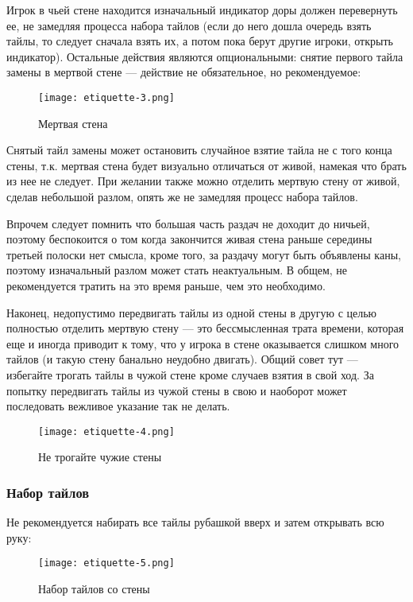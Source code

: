 Игрок в чьей стене находится изначальный индикатор доры должен перевернуть ее, не замедляя процесса набора тайлов (если до него дошла очередь взять тайлы, то следует сначала взять их, а потом пока берут другие игроки, открыть индикатор). Остальные действия являются опциональными: снятие первого тайла замены в мертвой стене --- действие не обязательное, но рекомендуемое:

\begin{figure}[H]
	\centering
	\texttt{[image: etiquette-3.png]}
	\caption{Мертвая стена}
\end{figure}

Снятый тайл замены может остановить случайное взятие тайла не с того конца стены, т.к. мертвая стена будет визуально отличаться от живой, намекая что брать из нее не следует. При желании также можно отделить мертвую стену от живой, сделав небольшой разлом, опять же не замедляя процесс набора тайлов.

Впрочем следует помнить что большая часть раздач не доходит до ничьей, поэтому беспокоится о том когда закончится живая стена раньше середины третьей полоски нет смысла, кроме того, за раздачу могут быть объявлены каны, поэтому изначальный разлом может стать неактуальным. В общем, не рекомендуется тратить на это время раньше, чем это необходимо.

Наконец, недопустимо передвигать тайлы из одной стены в другую с целью полностью отделить мертвую стену --- это бессмысленная трата времени, которая еще и иногда приводит к тому, что у игрока в стене оказывается слишком много тайлов (и такую стену банально неудобно двигать). Общий совет тут --- избегайте трогать тайлы в чужой стене кроме случаев взятия в свой ход. За попытку передвигать тайлы из чужой стены в свою и наоборот может последовать вежливое указание так не делать.

\begin{figure}[H]
	\centering
	\texttt{[image: etiquette-4.png]}
	\caption{Не трогайте чужие стены}
\end{figure}

\subsubsection{Набор тайлов}

Не рекомендуется набирать все тайлы рубашкой вверх и затем открывать всю руку:

\begin{figure}[H]
	\centering
	\texttt{[image: etiquette-5.png]}
	\caption{Набор тайлов со стены}
\end{figure}


